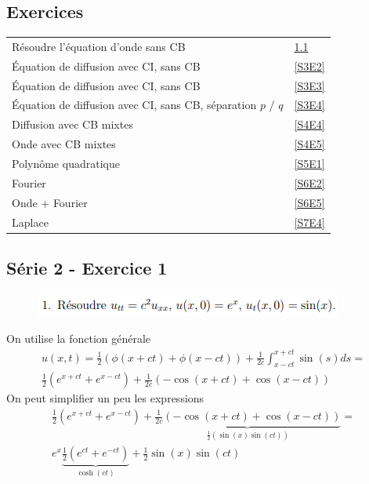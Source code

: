 \documentclass[resume]{subfiles}
\begin{document}
\begin{multicols}{2}
\section{Exercices}
\begin{center}
\begin{tabular}{p{6cm}l}
Résoudre l'équation d'onde sans CB & \ref{S2E1}\\
Équation de diffusion avec CI, sans CB & \ref{S3E2}\\
Équation de diffusion avec CI, sans CB & \ref{S3E3}\\
Équation de diffusion avec CI, sans CB, séparation $p$ / $q$ & \ref{S3E4}\\
Diffusion avec CB mixtes & \ref{S4E4}\\
Onde avec CB mixtes & \ref{S4E5}\\
Polynôme quadratique & \ref{S5E1}\\
Fourier & \ref{S6E2}\\
Onde + Fourier & \ref{S6E5}\\
Laplace & \ref{S7E4}\\

\end{tabular}
\end{center}
\subsection{Série 2 - Exercice 1}
\label{S2E1}
\begin{figure}[H]
\centering
\includegraphics[scale=0.5]{img_8.png}
\end{figure}
On utilise la fonction générale
\begin{multline*}
u(x,t)=\frac{1}{2}(\phi(x+ct)+\phi(x-ct))+\frac{1}{2c}\int_{x-ct}^{x+ct}\sin(s)ds=\\\frac{1}{2}\left(e^{x+ct}+e^{x-ct}\right)+\frac{1}{2c}\left(-\cos(x+ct)+\cos(x-ct)\right)
\end{multline*}
On peut simplifier un peu les expressions
\begin{multline*}
\frac{1}{2}\left(e^{x+ct}+e^{x-ct}\right)+\underbrace{\frac{1}{2c}\left(-\cos(x+ct)+\cos(x-ct)\right)}_{\frac{1}{2}\left(\sin(x)\sin(ct)\right)}=\\e^{x}\underbrace{\frac{1}{2}\left(e^{ct}+e^{-ct}\right)}_{\cosh(ct)}+\frac{1}{2}\sin(x)\sin(ct)
\end{multline*}

\end{multicols}
\end{document}
